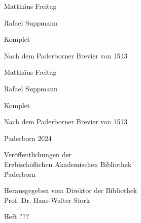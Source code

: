 \documentclass[fontsize=10pt,paper=A5,twoside,BCOR=1mm,DIV=21,headinclude]{scrarticle}
\begin{document}
\thispagestyle{empty}
{\centering\Large
	\null

	\vspace{2em}

	Matthäus Freitag

	\vspace{.5em}

	Rafael Suppmann

	\vfill

	\LARGE Komplet

	\vspace{1em}

	\Large Nach dem Paderborner Brevier von 1513
	
	\vfill
}
\pagebreak 
\thispagestyle{empty}
\null
\pagebreak
\thispagestyle{empty}
{\centering\LARGE
	\null

	\vspace{2em}

	Matthäus Freitag

	\vspace{.5em}

	Rafael Suppmann

	\vfill

	\Huge Komplet

	\vspace{1em}

	\LARGE Nach dem Paderborner Brevier von 1513
	
	\vfill

	\vspace{2em}

	\Large Paderborn 2024

	\vspace{2em}
\pagebreak 
\thispagestyle{empty}
\null

	\vfill

	\large Veröffentlichungen der\\Erzbischöflichen Akademischen Bibliothek\\Paderborn

	\vspace{.5em}

	Herausgegeben vom Direktor der Bibliothek\\
	Prof. Dr. Hans-Walter Stork

	\vspace{1.5em}

	Heft ???

	\vspace{3em}

}
\pagebreak
\thispagestyle{empty}
\null 
\end{document}
